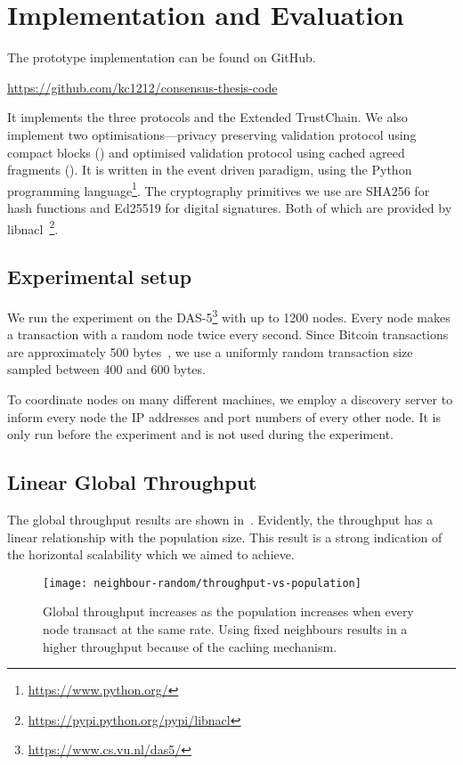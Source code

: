 \section{Implementation and Evaluation}
\label{sec:implementation}

The prototype implementation can be found on GitHub.
\begin{displayquote}
\url{https://github.com/kc1212/consensus-thesis-code}
\end{displayquote}
It implements the three protocols and the Extended TrustChain.
We also implement two optimisations---privacy preserving validation protocol using compact blocks ()
and optimised validation protocol using cached agreed fragments ().
It is written in the event driven paradigm, using the Python programming language\footnote{\url{https://www.python.org/}}.
The cryptography primitives we use are SHA256 for hash functions and Ed25519 for digital signatures.
Both of which are provided by libnacl~\footnote{\url{https://pypi.python.org/pypi/libnacl}}.


\subsection{Experimental setup}
\label{sec:experimental-setup}

We run the experiment on the DAS-5\footnote{\url{https://www.cs.vu.nl/das5/}} with up to 1200 nodes.
Every node makes a transaction with a random node twice every second.
Since Bitcoin transactions are approximately 500 bytes~\cite{txsize},
we use a uniformly random transaction size sampled between 400 and 600 bytes.

To coordinate nodes on many different machines,
we employ a discovery server to inform every node the IP addresses and port numbers of every other node.
It is only run before the experiment and is not used during the experiment.

\subsection{Linear Global Throughput}

The global throughput results are shown in~.
Evidently, the throughput has a linear relationship with the population size.
This result is a strong indication of the horizontal scalability which we aimed to achieve.

\begin{figure}[h]
  \centering
  \texttt{[image: neighbour-random/throughput-vs-population]}
  \caption{Global throughput increases as the population increases when every node transact at the same rate.
  Using fixed neighbours results in a higher throughput because of the caching mechanism.}
  \label{fig:global-throughput}
\end{figure}


